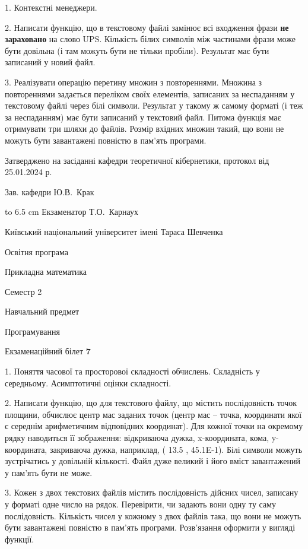 \documentclass[12pt, ukrainian]{article}
\begin{document}
{%
1. Контекстні менеджери.%
\par
2. Написати функцію, що в текстовому файлі замінює всі входження фрази \textbf{не зараховано} на слово UPS. Кількість білих символів між частинами фрази може бути довільна (і там можуть бути не тільки пробіли). Результат має бути записаний у новий файл.

\par
3. Реалізувати операцію перетину множин з повтореннями. Множина з повтореннями задається переліком своїх елементів, записаних за неспаданням у текстовому файлі через білі символи. Результат у такому ж самому форматі (і теж за неспаданням) має бути записаний у текстовий файл. Питома функція має отримувати три шляхи до файлів. Розмір вхідних множин такий, що вони не можуть бути завантажені повністю в пам’ять програми.

}
{\smallskip\smallskip \begin {scriptsize} Затверджено на засіданні кафедри теоретичної кібернетики, протокол   від   25.01.2024 р.\par\smallskip\smallskip\smallskip\smallskip
{\parbox {6.5 cm} {Зав. кафедри \dotfill Ю.В.~Крак}}\hspace {0.7cm} {\hbox to 6.5 cm { Екзаменатор \dotfill Т.О.~Карнаух}} \end{scriptsize}}
\newpage
{{\begin {scriptsize}\par
{ \center  Київський національний університет імені Тараса Шевченка \par}
{\parbox {5 cm}{Освітня програма \hfill}{\parbox {7 cm}{Прикладна математика\hfill}}\parbox {6 cm}{\hfill Семестр 2}}\par
{\parbox {5 cm} {Навчальний предмет \hfill}\parbox {7 cm}{Програмування \hfill}\parbox {6cm}{\hfill}\par}\vspace{-15pt} \end{scriptsize}}{\center Екзаменаційний білет \No \textbf { 7 }\par}}
{%
1. Поняття часової та просторової складності обчислень. Складність у середньому. Асимптотичні оцінки складності.%
\par
2. Написати функцію, що для текстового файлу, що містить послідовність точок площини, обчислює центр мас заданих точок (центр мас -- точка, координати якої є середнім арифметичним відповідних координат). Для кожної точки на окремому рядку наводиться її зображення: відкриваюча дужка, x-координата, кома, y-координата, закриваюча дужка, наприклад, ( 13.5 , 45.1E-1). Білі символи можуть зустрічатись у довільній кількості. Файл дуже великий і його вміст завантажений у пам'ять бути не може.

\par
3. Кожен з двох текстових файлів містить послідовність дійсних чисел, записану у форматі одне число на рядок.  Перевірити, чи задають вони одну ту саму послідовність. Кількість чисел у кожному з двох файлів така, що вони не можуть бути завантажені повністю в пам'ять програми. Розв'язання оформити у вигляді функції.

}
\end{document}

